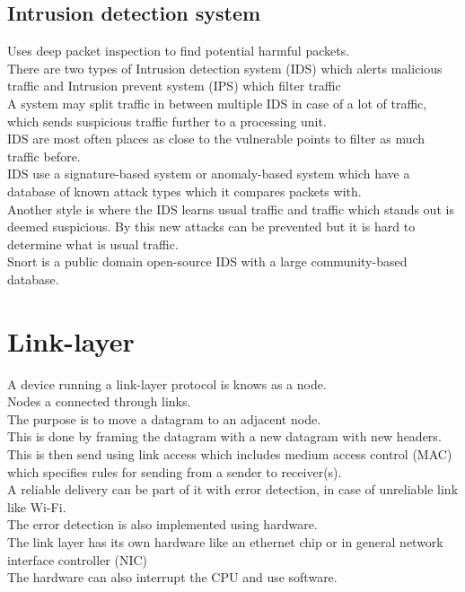 \documentclass[12pt, a4paper]{article}
\begin{document}
		\subsection{Intrusion detection system}
			Uses deep packet inspection to find potential harmful packets.\\
			There are two types of Intrusion detection system (IDS) which alerts malicious traffic and Intrusion prevent system (IPS) which filter traffic\\
			A system may split traffic in between multiple IDS in case of a lot of traffic, which sends suspicious traffic further to a processing unit.\\
			IDS are most often places as close to the vulnerable points to filter as much traffic before.\\
			IDS use a signature-based system or anomaly-based system which have a database of known attack types which it compares packets with.\\
			Another style is where the IDS learns usual traffic and traffic which stands out is deemed suspicious. By this new attacks can be prevented but it is hard to determine what is usual traffic.\\
			Snort is a public domain open-source IDS with a large community-based database.
	\section{Link-layer}
		A device running a link-layer protocol is knows as a node.\\
		Nodes a connected through links.\\
		The purpose is to move a datagram to an adjacent node.\\
		This is done by framing the datagram with a new datagram with new headers.\\
		This is then send using link access which includes medium access control (MAC) which specifies rules for sending from a sender to receiver(s).\\
		A reliable delivery can be part of it with error detection, in case of unreliable link like Wi-Fi.\\
		The error detection is also implemented using hardware.\\
		The link layer has its own hardware like an ethernet chip or in general network interface controller (NIC)\\
		The hardware can also interrupt the CPU and use software.\\
\end{document}
